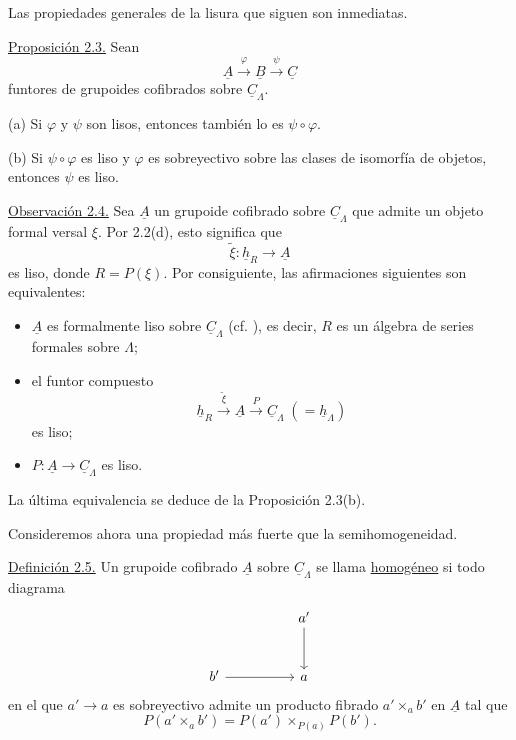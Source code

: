 Las propiedades generales de la lisura que siguen son inmediatas.

\underline{Proposición 2.3.} Sean
\[
 \underline A\xrightarrow{\ \varphi\ }\underline B
 \xrightarrow{\ \psi\ }\underline C
\]
funtores de grupoides cofibrados sobre $\underline C_\Lambda$.

(a) Si $\varphi$ y $\psi$ son lisos, entonces también lo es
$\psi\circ\varphi$.

(b) Si $\psi\circ\varphi$ es liso y $\varphi$ es sobreyectivo sobre
las clases de isomorfía de objetos, entonces $\psi$ es liso.


\underline{Observación 2.4.} Sea $\underline A$ un grupoide cofibrado
sobre $\underline C_\Lambda$ que admite un objeto formal versal $\xi$.
Por 2.2(d), esto significa que
\[
 \tilde\xi:\underline h_R\longrightarrow\underline A
\]
es liso, donde $R=P(\xi)$. Por consiguiente, las afirmaciones
siguientes son equivalentes:

\begin{itemize}
\item $\underline A$ es formalmente liso sobre $\underline C_\Lambda$
      (cf. ), es decir, $R$ es un álgebra de series formales sobre
      $\Lambda$;
\item el funtor compuesto
      \[
       \underline h_R\xrightarrow{\ \tilde\xi\ }\underline A
       \xrightarrow{\ P\ }\underline C_\Lambda
       \;(=\underline h_\Lambda)
      \]
      es liso;
\item $P:\underline A\longrightarrow\underline C_\Lambda$ es
      liso.
\end{itemize}
La última equivalencia se deduce de la Proposición 2.3(b).

Consideremos ahora una propiedad más fuerte que la semihomogeneidad.

\underline{Definición 2.5.} Un grupoide cofibrado $\underline A$ sobre
$\underline C_\Lambda$ se llama \underline{homogéneo} si todo diagrama
\[
\begin{tikzcd}[row sep=large,column sep=huge]
 & a' \arrow[d]\\
 b' \arrow[r] & a
\end{tikzcd}
\]
en el que $a'\longrightarrow a$ es sobreyectivo admite un producto
fibrado $a'\times_a b'$ en $\underline A$ tal que
\[
 P(a'\times_a b')=
 P(a')\times_{P(a)}P(b').
\]


